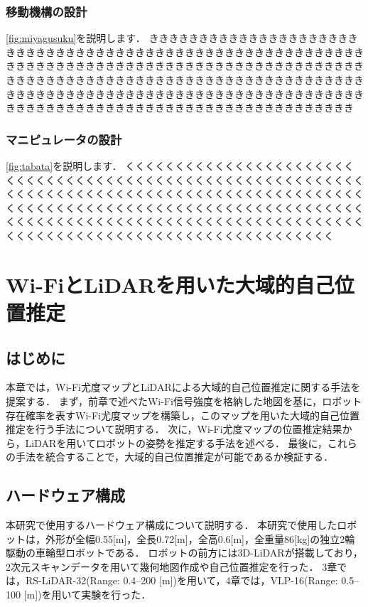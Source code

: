 \subsection{移動機構の設計}
\ref{fig:miyagusuku}を説明します．
きききききききききききききききききききききききききききききききききききききききききききききききききききききききききききききききききききききききききききききききききききききききききききききききききききききききききききききききききききききききききききききききききききききききききききききききききききききききききききききききききききききききききききききききききききききききききききききききききききききききき

\subsection{マニピュレータの設計}
\ref{fig:tabata}を説明します．
くくくくくくくくくくくくくくくくくくくくくくくくくくくくくくくくくくくくくくくくくくくくくくくくくくくくくくくくくくくくくくくくくくくくくくくくくくくくくくくくくくくくくくくくくくくくくくくくくくくくくくくくくくくくくくくくくくくくくくくくくくくくくくくくくくくくくくくくくくくくくくくくくくくくくくくくくくくくくくくくくくくくくくくくくくくくくくくくくくくくくくくくくくくくくくくくくくくくくくくく

\chapter{Wi-FiとLiDARを用いた大域的自己位置推定}
\section{はじめに}
本章では，Wi-Fi尤度マップとLiDARによる大域的自己位置推定に関する手法を提案する．
まず，前章で述べたWi-Fi信号強度を格納した地図を基に，ロボット存在確率を表すWi-Fi尤度マップを構築し，このマップを用いた大域的自己位置推定を行う手法について説明する．
次に，Wi-Fi尤度マップの位置推定結果から，LiDARを用いてロボットの姿勢を推定する手法を述べる．
最後に，これらの手法を統合することで，大域的自己位置推定が可能であるか検証する．


\section{ハードウェア構成}
本研究で使用するハードウェア構成について説明する．
本研究で使用したロボットは，外形が全幅0.55[m]，全長0.72[m]，全高0.6[m]，全重量86[kg]の独立2輪駆動の車輪型ロボットである．
ロボットの前方には3D-LiDARが搭載しており，2次元スキャンデータを用いて幾何地図作成や自己位置推定を行った．
3章では，RS-LiDAR-32(Range: 0.4–200 [m])を用いて，4章では，VLP-16(Range: 0.5–100 [m])を用いて実験を行った．

